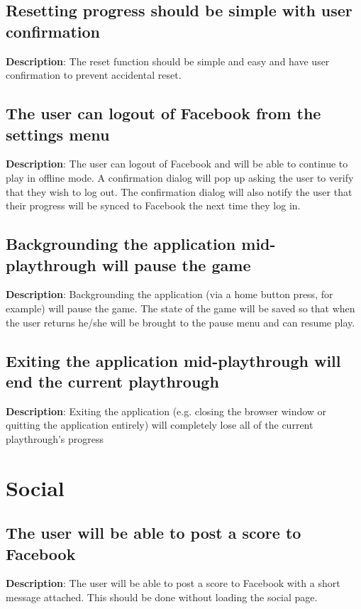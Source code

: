\subsection{Resetting progress should be simple with user confirmation}
\textbf{Description}: The reset function should be simple and easy
and have user confirmation to prevent accidental reset.

\subsection{The user can logout of Facebook from the settings menu}
\textbf{Description}: The user can logout of Facebook and will be
able to continue to play in offline mode. A confirmation dialog will
pop up asking the user to verify that they wish to log out. The confirmation
dialog will also notify the user that their progress will be synced
to Facebook the next time they log in.

\subsection{Backgrounding the application mid-playthrough will pause
the game}
\textbf{Description}: Backgrounding the application (via a home button
press, for example) will pause the game. The state of the game will
be saved so that when the user returns he/she will be brought to the
pause menu and can resume play.

\subsection{Exiting the application mid-playthrough will end the current playthrough}
\textbf{Description}: Exiting the application (e.g. closing the browser
window or quitting the application entirely) will completely lose
all of the current playthrough\textquoteright{}s progress

\section{Social}
\renewcommand\thesubsection{SOC-%
\ifnum\value{subsection}<10 0\fi
\arabic{subsection}}
\subsection{The user will be able to post a score to Facebook}
\textbf{Description}: The user will be able to post a score to Facebook
with a short message attached. This should be done without loading
the social page.

